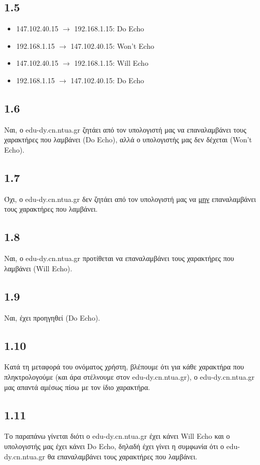 		\subsection*{1.5}
			\begin{itemize}
				\item 147.102.40.15 $\rightarrow$ 192.168.1.15: Do Echo 
				\item 192.168.1.15 $\rightarrow$ 147.102.40.15: Won't Echo
				\item 147.102.40.15 $\rightarrow$ 192.168.1.15: Will Echo
				\item 192.168.1.15 $\rightarrow$ 147.102.40.15: Do Echo
			\end{itemize}
		
		\subsection*{1.6}
			Ναι, ο edu-dy.cn.ntua.gr ζητάει από τον υπολογιστή μας να επαναλαμβάνει τους χαρακτήρες που λαμβάνει (Do Echo), αλλά ο υπολογιστής μας δεν δέχεται (Won't Echo). 
		
		\subsection*{1.7}
			Όχι, ο edu-dy.cn.ntua.gr δεν ζητάει από τον υπολογιστή μας να \underline{μην} επαναλαμβάνει τους χαρακτήρες που λαμβάνει.
		
		\subsection*{1.8}
			Nαι, ο edu-dy.cn.ntua.gr προτίθεται να επαναλαμβάνει τους χαρακτήρες που λαμβάνει (Will Echo).
		
		\subsection*{1.9}
			Ναι, έχει προηγηθεί (Do Echo).
		
		\subsection*{1.10}
			Κατά τη μεταφορά του ονόματος χρήστη, βλέπουμε ότι για κάθε χαρακτήρα που πληκτρολογούμε (και άρα στέλνουμε στον edu-dy.cn.ntua.gr), ο edu-dy.cn.ntua.gr μας απαντά αμέσως πίσω με τον ίδιο χαρακτήρα. 
			
		\subsection*{1.11}
			Το παραπάνω γίνεται διότι ο edu-dy.cn.ntua.gr έχει κάνει Will Echo και ο υπολογιστής μας έχει κάνει Do Echo, δηλαδή έχει γίνει η συμφωνία ότι ο edu-dy.cn.ntua.gr θα επαναλαμβάνει τους χαρακτήρες που λαμβάνει.
		
